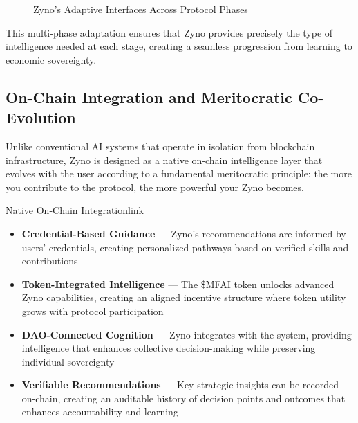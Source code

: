 \begin{figure}[H]
\caption{Zyno's Adaptive Interfaces Across Protocol Phases}
\label{fig:zyno-adaptive-interfaces}
\end{figure}

This multi-phase adaptation ensures that Zyno provides precisely the type of intelligence needed at each stage, creating a seamless progression from learning to economic sovereignty.

\subsection{On-Chain Integration and Meritocratic Co-Evolution}

Unlike conventional AI systems that operate in isolation from blockchain infrastructure, Zyno is designed as a native on-chain intelligence layer that evolves with the user according to a fundamental meritocratic principle: the more you contribute to the protocol, the more powerful your Zyno becomes.

\begin{mfai-box}{Native On-Chain Integration}{link}
\begin{itemize}
    \item \textbf{Credential-Based Guidance} — Zyno's recommendations are informed by users'  credentials, creating personalized pathways based on verified skills and contributions
    
    \item \textbf{Token-Integrated Intelligence} — The \$MFAI token unlocks advanced Zyno capabilities, creating an aligned incentive structure where token utility grows with protocol participation
    
    \item \textbf{DAO-Connected Cognition} — Zyno integrates with the  system, providing intelligence that enhances collective decision-making while preserving individual sovereignty
    
    \item \textbf{Verifiable Recommendations} — Key strategic insights can be recorded on-chain, creating an auditable history of decision points and outcomes that enhances accountability and learning
\end{itemize}
\end{mfai-box}

